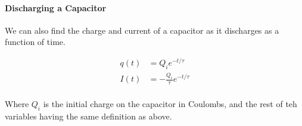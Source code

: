 \paragraph*{Discharging a Capacitor}
We can also find the charge and current of a capacitor as it discharges as a function of time.

\begin{align*}
    q(t) &= Q_ie^{-t/\tau}\\
    I(t) &= -\frac{Q_i}{\tau}e^{-t/\tau}\\
\end{align*}

Where $Q_i$ is the initial charge on the capacitor in Coulombs, and the rest of teh variables having the same definition as above.